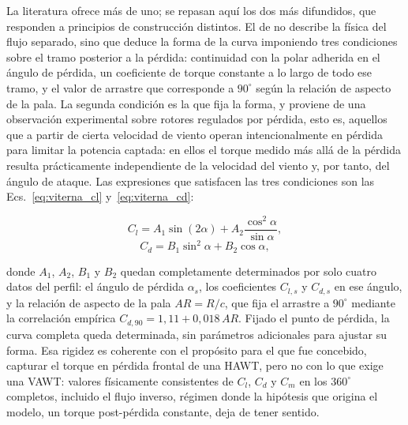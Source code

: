 La literatura ofrece más de uno; se repasan aquí los dos más difundidos, que responden a principios de construcción distintos. El de \textcite{viterna1982theoretical} no describe la física del flujo separado, sino que deduce la forma de la curva imponiendo tres condiciones sobre el tramo posterior a la pérdida: continuidad con la polar adherida en el ángulo de pérdida, un coeficiente de torque constante a lo largo de todo ese tramo, y el valor de arrastre que corresponde a $90^\circ$ según la relación de aspecto de la pala. La segunda condición es la que fija la forma, y proviene de una observación experimental sobre rotores regulados por pérdida, esto es, aquellos que a partir de cierta velocidad de viento operan intencionalmente en pérdida para limitar la potencia captada: en ellos el torque medido más allá de la pérdida resulta prácticamente independiente de la velocidad del viento y, por tanto, del ángulo de ataque. Las expresiones que satisfacen las tres condiciones son las Ecs.~\ref{eq:viterna_cl} y~\ref{eq:viterna_cd}:

\begin{equation}
C_l = A_1 \sin(2\alpha) + A_2 \frac{\cos^2\alpha}{\sin\alpha},
\label{eq:viterna_cl}
\end{equation}
\begin{equation}
C_d = B_1 \sin^2\alpha + B_2 \cos\alpha,
\label{eq:viterna_cd}
\end{equation}

donde $A_1$, $A_2$, $B_1$ y $B_2$ quedan completamente determinados por solo cuatro datos del perfil: el ángulo de pérdida $\alpha_s$, los coeficientes $C_{l,s}$ y $C_{d,s}$ en ese ángulo, y la relación de aspecto de la pala $AR = R/c$, que fija el arrastre a $90^\circ$ mediante la correlación empírica $C_{d,90} = 1{,}11 + 0{,}018\,AR$. Fijado el punto de pérdida, la curva completa queda determinada, sin parámetros adicionales para ajustar su forma. Esa rigidez es coherente con el propósito para el que fue concebido, capturar el torque en pérdida frontal de una HAWT, pero no con lo que exige una VAWT: valores físicamente consistentes de $C_l$, $C_d$ y $C_m$ en los $360^\circ$ completos, incluido el flujo inverso, régimen donde la hipótesis que origina el modelo, un torque post-pérdida constante, deja de tener sentido.

